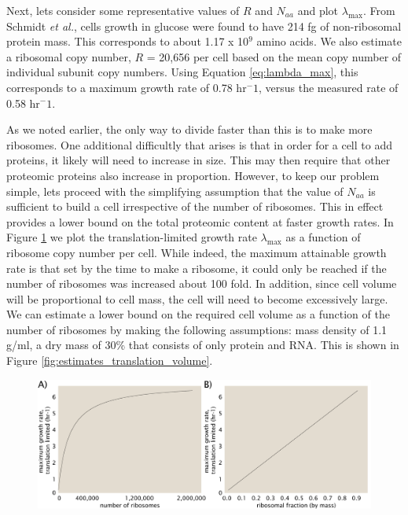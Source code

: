 \documentclass[11pt, letterpaper]{article}
\begin{document}

Next, lets consider some representative values of $R$ and $N_{aa}$ and plot
$\lambda_{\text{max}}$. From Schmidt {\it et al.}, cells growth in glucose were
found to have 214 fg of non-ribosomal  protein mass. This corresponds to about
1.17 x 10$^9$ amino acids. We also estimate a  ribosomal copy number, $R$ =
20,656 per cell based on the mean copy number of individual subunit copy
numbers. Using Equation \ref{eq:lambda_max}, this corresponds to a maximum
growth rate of 0.78 hr$^-1$, versus the measured rate of 0.58 hr$^-1$.

As we noted earlier, the only way to divide faster than this is to make more
ribosomes. One additional difficultly that arises is that in order for a cell to
add proteins, it likely will need to increase in size. This may then require
that other proteomic proteins also increase in proportion. However, to keep our
problem simple, lets proceed with the simplifying assumption that the value of
$N_{aa}$ is sufficient to build a cell irrespective of the number of ribosomes.
This in effect provides a lower bound on the total proteomic content at faster
growth rates. In Figure \ref{fig:estimates_translation_toy_1} we plot the translation-limited growth rate
$\lambda_{\text{max}}$ as a function of ribosome copy number per cell. While indeed,
the maximum attainable growth rate is that set by the time to make a ribosome,
it could only be reached if the number of ribosomes was increased about 100 fold.
In addition, since cell volume will be proportional to cell mass, the cell will need
to become excessively large. We can estimate a lower bound on the required cell
volume as a function of the number of ribosomes by making the following assumptions:  mass density of 1.1
g/ml, a dry mass of 30\% that consists of only protein and RNA.  This is shown
in Figure \ref{fig:estimates_translation_volume}.

\begin{figure}[H]
		\centering
    \includegraphics[width=1\textwidth]{../../code/figures/SI/estimates_translation_toy_1.pdf}
  \caption{}
  \label{fig:estimates_translation_toy_1}
\end{figure}
\end{document}
